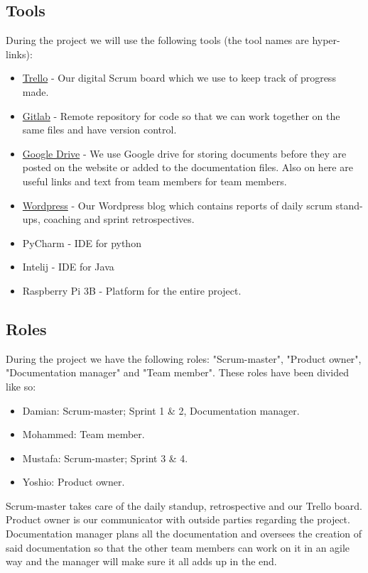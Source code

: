 \documentclass[12pt]{article}
\begin{document}
	\subsection{Tools}
	During the project we will use the following tools (the tool names are hyper-links):
	\begin{itemize}
		\item \href{https://trello.com/b/VLCdhQAQ/sprint-3}{Trello} - Our digital Scrum board which we use to keep track of progress made.
		\item \href{https://gitlab.fdmci.hva.nl/hadiyem/row}{Gitlab} - Remote repository for code so that we can work together on the same files and have version control.
		\item \href{https://drive.google.com/drive/folders/1IJEu7igVdK12MzVx3jkXZMvB5HUXFuYZ?usp=sharing}{Google Drive} - We use Google drive for storing documents before they are posted on the website or added to the documentation files. Also on here are useful links and text from team members for team members.
		\item \href{https://metabotsrow.wordpress.com/}{Wordpress} - Our Wordpress blog which contains reports of daily scrum stand-ups, coaching and sprint retrospectives.
		\item PyCharm - IDE for python
		\item Intelij - IDE for Java
		\item Raspberry Pi 3B - Platform for the entire project.
	\end{itemize}  
	\subsection{Roles}
	During the project we have the following roles: "Scrum-master", "Product owner", "Documentation manager" and "Team member". These roles have been divided like so:
	\begin{itemize}
		\item Damian: Scrum-master; Sprint 1 \& 2, Documentation manager.
		\item Mohammed: Team member.
		\item Mustafa: Scrum-master; Sprint 3 \& 4.
		\item Yoshio: Product owner.
	\end{itemize}
	Scrum-master takes care of the daily standup, retrospective and our Trello board.\\
	Product owner is our communicator with outside parties regarding the project.\\
	Documentation manager plans all the documentation and oversees the creation of said documentation so that the other team members can work on it in an agile way and the manager will make sure it all adds up in the end.
\end{document}
